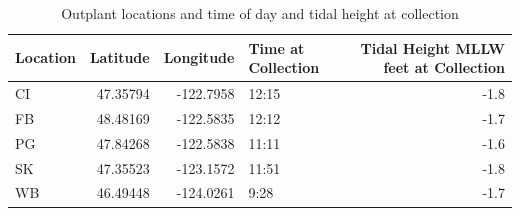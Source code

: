 \documentclass [11pt, proquest] {uwthesis}[2015/03/03]
\begin{document}
\begingroup\fontsize{10}{12}\selectfont
\begin{longtable}[t]{lrrlr}
\caption{\label{tab:deployment}Outplant locations and time of day and tidal height at collection}\\
\toprule
Location & Latitude & Longitude & Time at Collection & Tidal Height  MLLW  feet  at Collection\\
\midrule
CI & 47.35794 & -122.7958 & 12:15 & -1.8\\
FB & 48.48169 & -122.5835 & 12:12 & -1.7\\
PG & 47.84268 & -122.5838 & 11:11 & -1.6\\
SK & 47.35523 & -123.1572 & 11:51 & -1.8\\
WB & 46.49448 & -124.0261 & 9:28 & -1.7\\
\bottomrule
\end{longtable}
\endgroup{}
\clearpage
\end{document}
